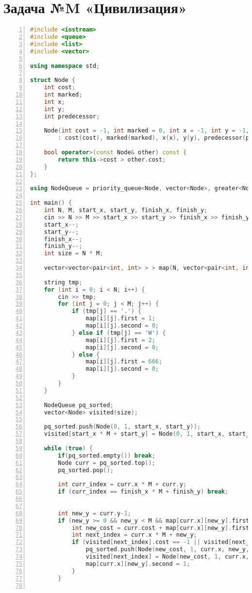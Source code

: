 \documentclass{article}
\begin{document}
\section{Задача №M «Цивилизация»}
\begin{lstlisting}[language=C++, frame=single, basicstyle=\ttfamily, numbers=left, numberstyle=\tiny]
#include <iostream>
#include <queue>
#include <list>
#include <vector>

using namespace std;   

struct Node {
    int cost;
    int marked;
    int x;
    int y;
    int predecessor;

    Node(int cost = -1, int marked = 0, int x = -1, int y = -1, int pred = -1) 
        : cost(cost), marked(marked), x(x), y(y), predecessor(pred) {}

    bool operator>(const Node& other) const {
        return this->cost > other.cost;
    }
};

using NodeQueue = priority_queue<Node, vector<Node>, greater<Node> >;

int main() {
    int N, M, start_x, start_y, finish_x, finish_y;
    cin >> N >> M >> start_x >> start_y >> finish_x >> finish_y;
    start_x--;
    start_y--;
    finish_x--;
    finish_y--;
    int size = N * M;

    vector<vector<pair<int, int> > > map(N, vector<pair<int, int> >(M));

    string tmp;
    for (int i = 0; i < N; i++) {
        cin >> tmp;
        for (int j = 0; j < M; j++) {
            if (tmp[j] == '.') {
                map[i][j].first = 1;
                map[i][j].second = 0;
            } else if (tmp[j] == 'W') {
                map[i][j].first = 2;
                map[i][j].second = 0;
            } else {
                map[i][j].first = 666;
                map[i][j].second = 0;
            }
        }
    }

    NodeQueue pq_sorted;
    vector<Node> visited(size);

    pq_sorted.push(Node(0, 1, start_x, start_y));
    visited[start_x * M + start_y] = Node(0, 1, start_x, start_y, -1);

    while (true) {
        if(pq_sorted.empty()) break;
        Node curr = pq_sorted.top();
        pq_sorted.pop();

        int curr_index = curr.x * M + curr.y;
        if (curr_index == finish_x * M + finish_y) break;

        
        int new_y = curr.y-1;
        if (new_y >= 0 && new_y < M && map[curr.x][new_y].first != 666 && !map[curr.x][new_y].second) {
            int new_cost = curr.cost + map[curr.x][new_y].first;
            int next_index = curr.x * M + new_y;
            if (visited[next_index].cost == -1 || visited[next_index].cost > new_cost) {
                pq_sorted.push(Node(new_cost, 1, curr.x, new_y, curr_index));
                visited[next_index] = Node(new_cost, 1, curr.x, new_y, curr_index);
                map[curr.x][new_y].second = 1;
            }
        }
        

\end{lstlisting}
\end{document}
